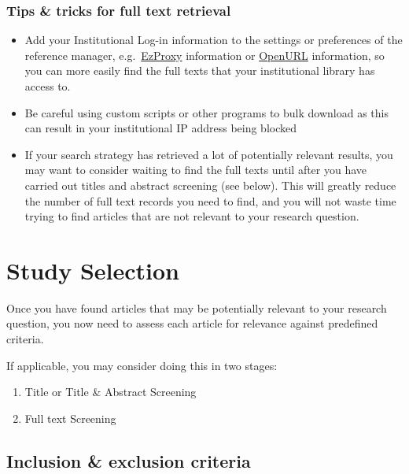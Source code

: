 \documentclass[
]{book}
\providecommand{\tightlist}{%
  \setlength{\itemsep}{0pt}\setlength{\parskip}{0pt}}
\begin{document}
\hypertarget{tips-tricks-for-full-text-retrieval}{%
\subsection{Tips \& tricks for full text retrieval}\label{tips-tricks-for-full-text-retrieval}}

\begin{itemize}
\tightlist
\item
  Add your Institutional Log-in information to the settings or preferences of the reference manager, e.g.~\href{https://ezproxy-db.appspot.com/}{EzProxy} information or \href{https://www.zotero.org/support/locate/openurl_resolvers}{OpenURL} information, so you can more easily find the full texts that your institutional library has access to.
\item
  Be careful using custom scripts or other programs to bulk download as this can result in your institutional IP address being blocked
\item
  If your search strategy has retrieved a lot of potentially relevant results, you may want to consider waiting to find the full texts until after you have carried out titles and abstract screening (see below). This will greatly reduce the number of full text records you need to find, and you will not waste time trying to find articles that are not relevant to your research question.
\end{itemize}

\hypertarget{study-selection}{%
\chapter{Study Selection}\label{study-selection}}

Once you have found articles that may be potentially relevant to your research question, you now need to assess each article for relevance against predefined criteria.

If applicable, you may consider doing this in two stages:

\begin{enumerate}
\def\labelenumi{\arabic{enumi}.}
\tightlist
\item
  Title or Title \& Abstract Screening
\item
  Full text Screening
\end{enumerate}

\hypertarget{inclusion-exclusion-criteria}{%
\section{Inclusion \& exclusion criteria}\label{inclusion-exclusion-criteria}}
\end{document}
